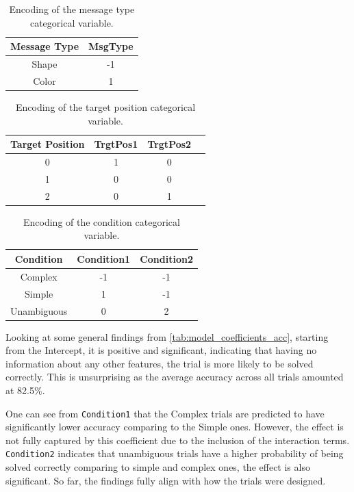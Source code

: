 \begin{table}[h!]
    \centering
    \begin{tabular}{|c|c|}
    \hline
    Message Type & \textbf{MsgType} \\ \hline
    Shape        & -1       \\ \hline
    Color        & 1        \\ \hline
    \end{tabular}
    \caption{Encoding of the message type categorical variable.}
    \label{tab:msgtype_encoding}
    \end{table}
    \hfill
    \begin{table}[h!]
    \centering
    \begin{tabular}{|c|c|c|c|}
    \hline
    Target Position & TrgtPos1 & TrgtPos2\\ \hline
    0               & 1    & 0    \\ \hline
    1               & 0    & 0    \\ \hline
    2               & 0    & 1    \\ \hline
    \end{tabular}
    \caption{Encoding of the target position categorical variable.}
    \label{tab:trgtpos_encoding}
    \end{table}
    \begin{table}[h!]
    \centering
    \begin{tabular}{|c|c|c|}
    \hline
    Condition     & Condition1 & Condition2 \\ \hline
    Complex       & -1   & -1   \\ \hline
    Simple        & 1    & -1   \\ \hline
    Unambiguous   & 0    & 2    \\ \hline
    \end{tabular}
    \caption{Encoding of the condition categorical variable.}
    \label{tab:condition_encoding}
\end{table}


Looking at some general findings from \autoref{tab:model_coefficients_acc}, starting from the Intercept, it is positive and significant, indicating that having no information about any other features, the trial is more likely to be solved correctly. This is unsurprising as the average accuracy across all trials amounted at 82.5\%. 

One can see from \texttt{Condition1} that the Complex trials are predicted to have significantly lower accuracy comparing to the Simple ones. However, the effect is not fully captured by this coefficient due to the inclusion of the interaction terms. \texttt{Condition2} indicates that unambiguous trials have a higher probability of being solved correctly comparing to simple and complex ones, the effect is also significant. So far, the findings fully align with how the trials were designed. 

